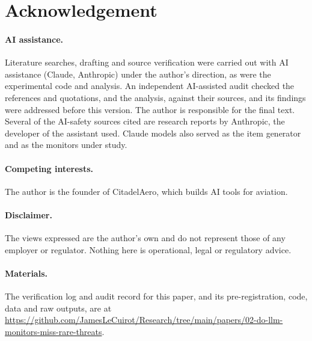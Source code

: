 \documentclass[11pt]{article}
\begin{document}
\section*{Acknowledgement}
\paragraph{AI assistance.} Literature searches, drafting and source verification were carried out with AI assistance (Claude, Anthropic) under the author's direction, as were the experimental code and analysis. An independent AI-assisted audit checked the references and quotations, and the analysis, against their sources, and its findings were addressed before this version. The author is responsible for the final text. Several of the AI-safety sources cited are research reports by Anthropic, the developer of the assistant used. Claude models also served as the item generator and as the monitors under study.
\paragraph{Competing interests.} The author is the founder of CitadelAero, which builds AI tools for aviation.
\paragraph{Disclaimer.} The views expressed are the author's own and do not represent those of any employer or regulator. Nothing here is operational, legal or regulatory advice.
\paragraph{Materials.} The verification log and audit record for this paper, and its pre-registration, code, data and raw outputs, are at \url{https://github.com/JamesLeCuirot/Research/tree/main/papers/02-do-llm-monitors-miss-rare-threats}.



\end{document}
